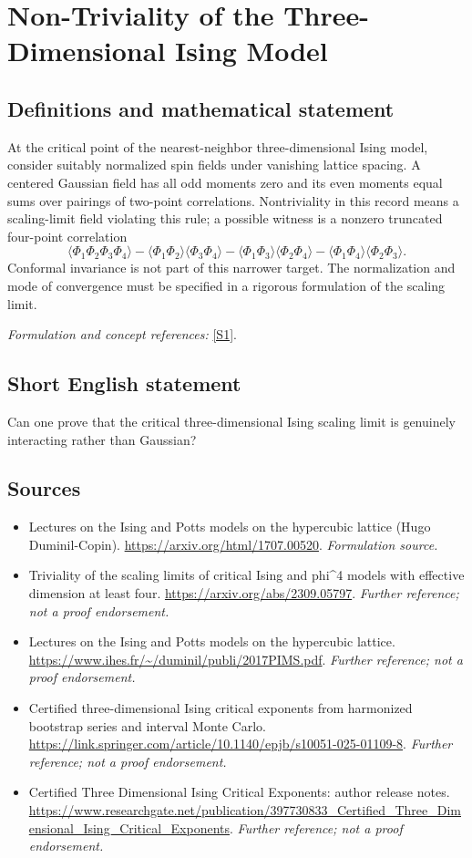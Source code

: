 \documentclass[11pt]{article}
\begin{document}
\section*{\texorpdfstring{Non-Triviality of the Three-Dimensional Ising Model}{Non-Triviality of the Three-Dimensional Ising Model}}\label{73}
\subsection{Definitions and mathematical statement}
At the critical point of the nearest-neighbor three-dimensional Ising model, consider suitably normalized spin fields under vanishing lattice spacing. A centered Gaussian field has all odd moments zero and its even moments equal sums over pairings of two-point correlations. Nontriviality in this record means a scaling-limit field violating this rule; a possible witness is a nonzero truncated four-point correlation
\[
 \langle\Phi_1\Phi_2\Phi_3\Phi_4\rangle
 -\langle\Phi_1\Phi_2\rangle\langle\Phi_3\Phi_4\rangle
 -\langle\Phi_1\Phi_3\rangle\langle\Phi_2\Phi_4\rangle
 -\langle\Phi_1\Phi_4\rangle\langle\Phi_2\Phi_3\rangle.
\]
Conformal invariance is not part of this narrower target. The normalization and mode of convergence must be specified in a rigorous formulation of the scaling limit.
\par\smallskip\textit{Formulation and concept references:} \href{https://arxiv.org/html/1707.00520}{[S1]}.

\subsection{Short English statement}
Can one prove that the critical three-dimensional Ising scaling limit is genuinely interacting rather than Gaussian?
\subsection{Sources}
\begin{itemize}
\item[S1]Lectures on the Ising and Potts models on the hypercubic lattice (Hugo Duminil-Copin).
\url{https://arxiv.org/html/1707.00520}.
\textit{Formulation source.}
\item[S2]Triviality of the scaling limits of critical Ising and phi\textasciicircum{}4 models with effective dimension at least four.
\url{https://arxiv.org/abs/2309.05797}.
\textit{Further reference; not a proof endorsement.}
\item[S3]Lectures on the Ising and Potts models on the hypercubic lattice.
\url{https://www.ihes.fr/~/duminil/publi/2017PIMS.pdf}.
\textit{Further reference; not a proof endorsement.}
\item[S4]Certified three-dimensional Ising critical exponents from harmonized bootstrap series and interval Monte Carlo.
\url{https://link.springer.com/article/10.1140/epjb/s10051-025-01109-8}.
\textit{Further reference; not a proof endorsement.}
\item[S5]Certified Three Dimensional Ising Critical Exponents: author release notes.
\url{https://www.researchgate.net/publication/397730833_Certified_Three_Dimensional_Ising_Critical_Exponents}.
\textit{Further reference; not a proof endorsement.}
\end{itemize}
\end{document}
